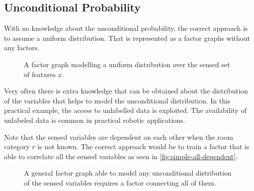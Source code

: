 \subsection{Unconditional Probability}
\label{sec:sample-uncond-prob}
With no knowledge about the unconditional probability, the correct approach is to
assume a uniform distribution. That is represented as a factor graphs without any factors.

\begin{figure}[h]
\centering
{}
\caption{\label{fig:simple-uniform-graph}A factor graph modelling a uniform
         distribution over the sensed set of features $x$.}
\end{figure}

Very often there is extra knowledge that can be obtained about the distribution
of the variables that helps to model the unconditional distribution.
In this practical example, the access to unlabelled data is exploited. The availability of
unlabeled data is common in practical robotic applications.

Note that the sensed variables are dependent on each other when the room
category $r$ is not known. The correct approach would be to train a
factor that is able to correlate all the sensed variables as seen in
\autoref{fig:simple-all-dependent}.

\begin{figure}[h]
\centering
{}
\caption{\label{fig:simple-all-dependent}A general factor graph able
         to model any unconditional distribution of the sensed variables
         requires a factor connecting all of them.}
\end{figure}

